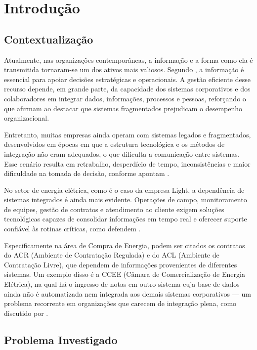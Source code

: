 \chapter{Introdução}
\label{sec_introducao}

\section{Contextualização}

Atualmente, nas organizações contemporâneas, a informação e a forma como ela é transmitida tornaram-se um dos ativos mais valiosos. Segundo \cite{turban2010}, a informação é essencial para apoiar decisões estratégicas e operacionais. A gestão eficiente desse recurso depende, em grande parte, da capacidade dos sistemas corporativos e dos colaboradores em integrar dados, informações, processos e pessoas, reforçando o que afirmam \cite{laudon2020} ao destacar que sistemas fragmentados prejudicam o desempenho organizacional.

Entretanto, muitas empresas ainda operam com sistemas legados e fragmentados, desenvolvidos em épocas em que a estrutura tecnológica e os métodos de integração não eram adequados, o que dificulta a comunicação entre sistemas. Esse cenário resulta em retrabalho, desperdício de tempo, inconsistências e maior dificuldade na tomada de decisão, conforme apontam \cite{stair2018}.

No setor de energia elétrica, como é o caso da empresa Light, a dependência de sistemas integrados é ainda mais evidente. Operações de campo, monitoramento de equipes, gestão de contratos e atendimento ao cliente exigem soluções tecnológicas capazes de consolidar informações em tempo real e oferecer suporte confiável às rotinas críticas, como defendem \cite{rezende2017}.

Especificamente na área de Compra de Energia, podem ser citados os contratos do ACR (Ambiente de Contratação Regulada) e do ACL (Ambiente de Contratação Livre), que dependem de informações provenientes de diferentes sistemas. Um exemplo disso é a CCEE (Câmara de Comercialização de Energia Elétrica), na qual há o ingresso de notas em outro sistema cuja base de dados ainda não é automatizada nem integrada aos demais sistemas corporativos — um problema recorrente em organizações que carecem de integração plena, como discutido por \cite{pressman2016}.

\section{Problema Investigado}

